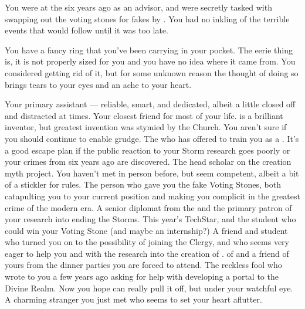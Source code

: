 \documentclass[char]{GL2020}
\begin{document}
\begin{itemz}[Notes]
    \item You were at the \pSchool{} six years ago as an advisor, and were secretly tasked with swapping out the voting stones for fakes by \cEvil{}. You had no inkling of the terrible events that would follow until it was too late.
    \item You have a fancy ring that you've been carrying in your pocket. The eerie thing is, it is not properly sized for you and you have no idea where it came from. You considered getting rid of it, but for some unknown reason the thought of doing so brings tears to your eyes and an ache to your heart.
\end{itemz}

\begin{contacts}
    \contact{\cAssistantScientist{}} Your primary assistant — reliable, smart, and dedicated, albeit a little closed off and distracted at times.
    \contact{\cChupInventor{}} Your closest friend for most of your life. \cChupInventor{} is a brilliant inventor, but \cChupInventor{\their} greatest invention was stymied by the Church. You aren't sure if you should continue to enable \cChupInventor{\their} grudge.
    \contact{\cBeetle{}} The \cBeetle{\cleric} who has offered to train you as a \cHeadScientist{\cleric}. It's a good escape plan if the public reaction to your Storm research goes poorly or your crimes from six years ago are discovered.
    \contact{\cEbbPriest{}} The head scholar on the creation myth project. You haven't met in person before, but \cEbbPriest{\they} seem\cEbbPriest{\verbs} competent, albeit a bit of a stickler for rules.
    \contact{\cEvil{}} The person who gave you the fake Voting Stones, both catapulting you to your current position and making you complicit in the greatest crime of the modern era. 
    \contact{\cDiplomat{}} A senior diplomat from the \pTech{} and the primary patron of your research into ending the Storms. 
    \contact{\cTechStar{}} This year's TechStar, and the \pTech{} student who could win your Voting Stone (and maybe an internship?)
    \contact{\cScholarship{}} A friend and student who turned you on to the possibility of joining the Clergy, and who seems very eager to help you and \cEbbPriest{} with the research into the creation of \pEarth{}.
    \contact{\cHeir{}} \cHeir{\Nibling} of \cDiplomat{} and a friend of yours from the dinner parties you are forced to attend. 
    \contact{\cCurse{}} The reckless fool who wrote to you a few years ago asking for help with developing a portal to the Divine Realm. Now you hope \cCurse{\they} can really pull it off, but under your watchful eye.
    \contact{\cChupAvenger{}} A charming stranger you just met who seems to set your heart aflutter.
\end{contacts}
\end{document}
